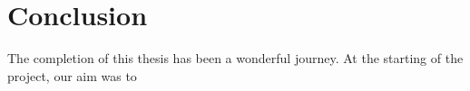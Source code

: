 \chapter{Conclusion}
The completion of this thesis has been a wonderful journey. At the starting of the project, our aim was to 
